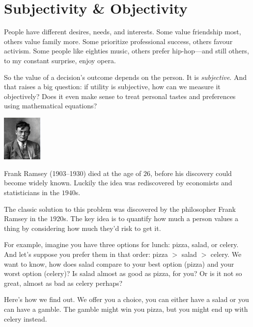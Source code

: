 \documentclass[justified]{tufte-book}
\newcommand{\gt}{>}
\theoremstyle{definition}
\theoremstyle{definition}
\theoremstyle{definition}
\theoremstyle{definition}
\theoremstyle{remark}
\begin{document}
\hypertarget{subjectivity-objectivity}{%
\section{Subjectivity \& Objectivity}\label{subjectivity-objectivity}}

People have different desires, needs, and interests. Some value friendship most, others value family more. Some prioritize professional success, others favour activism. Some people like eighties music, others prefer hip-hop---and still others, to my constant surprise, enjoy opera.

So the value of a decision's outcome depends on the person. It is \emph{subjective}. And that raises a big question: if utility is subjective, how can we measure it objectively? Does it even make sense to treat personal tastes and preferences using mathematical equations?

\begin{marginfigure}
\includegraphics[width=0.77in]{img/ramsey} \caption[Frank Ramsey (1903--1930) died at the age of $26$, before his discovery could become widely known]{Frank Ramsey (1903--1930) died at the age of $26$, before his discovery could become widely known. Luckily the idea was rediscovered by economists and statisticians in the $1940$s.}\label{fig:ramsey}
\end{marginfigure}

The classic solution to this problem was discovered by the philosopher Frank Ramsey in the \(1920\)s. The key idea is to quantify how much a person values a thing by considering how much they'd risk to get it.

For example, imagine you have three options for lunch: pizza, salad, or celery. And let's suppose you prefer them in that order: pizza \(\gt\) salad \(\gt\) celery. We want to know, how does salad compare to your best option (pizza) and your worst option (celery)? Is salad almost as good as pizza, for you? Or is it not so great, almost as bad as celery perhaps?

Here's how we find out. We offer you a choice, you can either have a salad or you can have a gamble. The gamble might win you pizza, but you might end up with celery instead.
\end{document}

